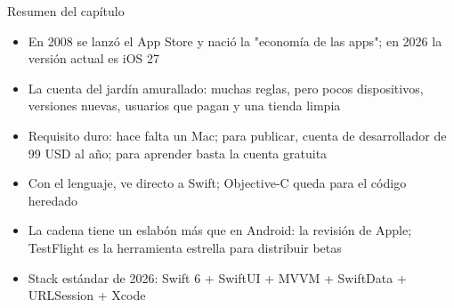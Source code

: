 \begin{tcbsummary}{Resumen del capítulo}
\begin{itemize}
  \item En 2008 se lanzó el App Store y nació la "economía de las apps"; en 2026 la versión actual es iOS 27
  \item La cuenta del jardín amurallado: muchas reglas, pero pocos dispositivos, versiones nuevas, usuarios que pagan y una tienda limpia
  \item Requisito duro: hace falta un Mac; para publicar, cuenta de desarrollador de 99 USD al año; para aprender basta la cuenta gratuita
  \item Con el lenguaje, ve directo a Swift; Objective-C queda para el código heredado
  \item La cadena tiene un eslabón más que en Android: la revisión de Apple; TestFlight es la herramienta estrella para distribuir betas
  \item Stack estándar de 2026: Swift 6 + SwiftUI + MVVM + SwiftData + URLSession + Xcode
\end{itemize}

\end{tcbsummary}
